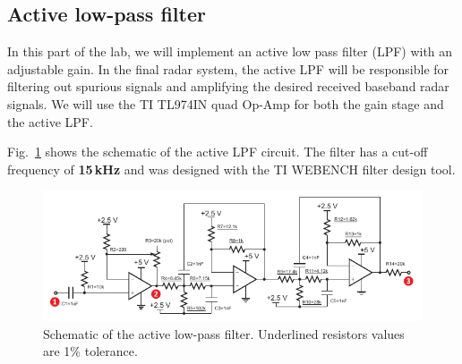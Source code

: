 \documentclass[letterpaper, 11pt]{article}
\begin{document}
\subsection{Active low-pass filter}
\label{sec:lpf}

In this part of the lab, we will implement an active low pass filter (LPF) with an adjustable gain. In the final radar system, the active LPF will be responsible for filtering out spurious signals and amplifying the desired received baseband radar signals. We will use the TI TL974IN quad Op-Amp for both the gain stage and the active LPF. 

Fig.~\ref{fig:lpf-sch} shows the schematic of the active LPF circuit. The filter has a cut-off frequency of \textbf{15\,kHz} and was designed with the TI WEBENCH filter design tool.  





\begin{figure}[h]
	\centering
	\includegraphics[width=5.3in]{lpf-sch}
	\caption{Schematic of the active low-pass filter. Underlined resistors values are 1\% tolerance.}
	\label{fig:lpf-sch}
\end{figure}
\end{document}
